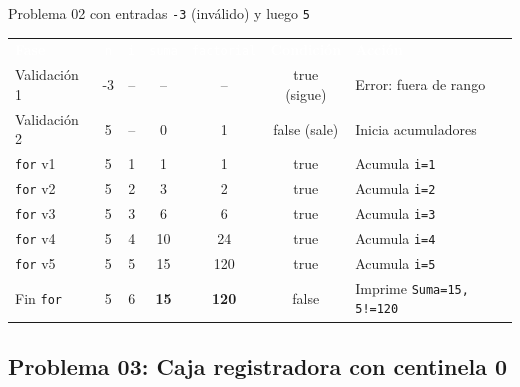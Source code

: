 \documentclass[11pt,letterpaper]{article}
\begin{document}




\begin{pruebaescritorio}{Problema 02 con entradas \texttt{-3} (inválido) y luego \texttt{5}}
\begin{center}
\footnotesize
\setlength{\tabcolsep}{4pt}
\renewcommand{\arraystretch}{1.15}
\begin{tabularx}{\linewidth}{l c c c c c X}
\rowcolor{AzulMarino}
\textcolor{white}{\textbf{Fase}} & \textcolor{white}{\texttt{n}} & \textcolor{white}{\texttt{i}} & \textcolor{white}{\texttt{suma}} & \textcolor{white}{\texttt{factorial}} & \textcolor{white}{\textbf{Condición}} & \textcolor{white}{\textbf{Acción}} \\
Validación 1 & -3 & -- & -- & -- & true (sigue) & Error: fuera de rango \\
Validación 2 & 5 & -- & 0 & 1 & false (sale) & Inicia acumuladores \\
\texttt{for} v1 & 5 & 1 & 1 & 1 & true & Acumula \texttt{i=1} \\
\texttt{for} v2 & 5 & 2 & 3 & 2 & true & Acumula \texttt{i=2} \\
\texttt{for} v3 & 5 & 3 & 6 & 6 & true & Acumula \texttt{i=3} \\
\texttt{for} v4 & 5 & 4 & 10 & 24 & true & Acumula \texttt{i=4} \\
\texttt{for} v5 & 5 & 5 & 15 & 120 & true & Acumula \texttt{i=5} \\
Fin \texttt{for} & 5 & 6 & \textbf{15} & \textbf{120} & false & Imprime \texttt{Suma=15, 5!=120} \\
\bottomrule
\end{tabularx}
\end{center}
\end{pruebaescritorio}

\subsection{Problema 03: Caja registradora con centinela 0}
\end{document}
